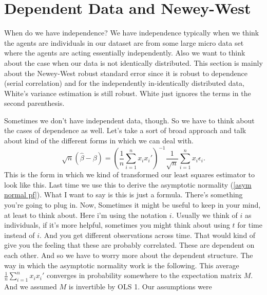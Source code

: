 \documentclass[11pt,a4paper]{amsart}
\theoremstyle{plain}
\theoremstyle{definition}
\begin{document}
\section{Dependent Data and Newey-West}
	   		  When do we have independence? We have independence typically when we think the agents are individuals in our dataset are from some large micro data set where the agents are acting essentially independently. Also we want to think about the case when our data is not identically distributed. This section is mainly about the Newey-West robust standard error since it is robust to dependence (serial correlation) and for the independently in-identically distributed data, White's variance estimation is still robust. White just ignores the terms in the second parenthesis.\par 
	   		 Sometimes we don't have independent data, though. So we have to think about the cases of dependence as well. Let's take a sort of broad approach and talk about kind of the different forms in which we can deal with.
	   		\[ \sqrt{n} (\hat{\beta} - \beta) = (\frac{1}{n}\sum_{i=1}^{n} x_{i}x_{i}')^{-1} \frac{1}{\sqrt{n}} \sum_{i=1}^{n} x_{i}\epsilon_{i}.	\]
	   		 This is the form in which we kind of transformed our least squares estimator to look like this. Last time we use this to derive the asymptotic normality (\ref{asym normal pf}). What I want to say is this is just a formula. There's something you're going to plug in. Now, Sometimes it might be useful to keep in your mind, at least to think about. Here i'm using the notation $i$. Usually we think of $i$ as individuals, if it's more helpful, sometimes you might think about using $t$ for time instead of $i$. And you get different observations across time. That would kind of give you the feeling that these are probably correlated. These are dependent on each other. And so we have to worry more about the dependent structure. The way in which the asymptotic normality work is the following. This average $\frac{1}{n}\sum_{i=1}^{n} x_{i}x_{i}'$ converges in probability somewhere to the expectation matrix $M$. And we assumed $M$ is invertible by OLS 1. Our assumptions were
\end{document}
